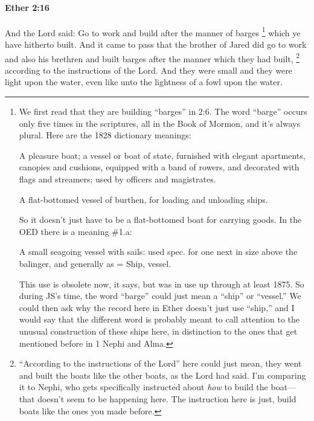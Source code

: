 		\paragraph{Ether 2:16} %
			\label{ETHER-2-16}

			And the Lord said:
			Go to work and build after the manner of barges%
				\footnote{%
					We first read that they are building ``barges'' in 2:6. The word ``barge'' occurs only five times in the scriptures, all in the Book of Mormon, and it's always plural. Here are the 1828 dictionary meanings:
						\begin{compactitem}
							\item[1] A pleasure boat; a vessel or boat of state, furnished with elegant apartments, canopies and cushions, equipped with a band of rowers, and decorated with flags and streamers; used by officers and magistrates.
							\item[2] A flat-bottomed vessel of burthen, for loading and unloading ships.
						\end{compactitem}
					So it doesn't just have to be a flat-bottomed boat for carrying goods. In the OED there is a meaning \#1.a:
						\begin{compactitem}
							\item[1.a] A small seagoing vessel with sails: used spec. for one next in size above the balinger, and generally as = Ship, vessel.
						\end{compactitem}
					This use is obsolete now, it says, but was in use up through at least 1875. So during JS's time, the word ``barge'' could just mean a ``ship'' or ``vessel.'' We could then ask why the record here in Ether doesn't just use ``ship,'' and I would say that the different word is probably meant to call attention to the unusual construction of these ships here, in distinction to the ones that get mentioned before in 1 Nephi and Alma.
					}
			which ye have hitherto built.
			And it came to pass that the brother of Jared did go to work and also his brethren
			and built barges after the manner which they had built,
				\footnote{%
					``According to the instructions of the Lord'' here could just mean, they went and built the boats like the other boats, as the Lord had said. I'm comparing it to Nephi, who gets specifically instructed about \textit{how} to build the boat---that doesn't seem to be happening here. The instruction here is just, build boats like the ones you made before.
					}%
			according to the instructions of the Lord.
			And they were small and they were light upon the water,
			even like unto the lightness of a fowl upon the water.

